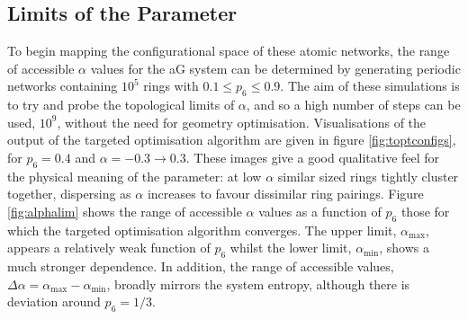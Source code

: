 \subsection{Limits of the \aw{} Parameter}

To begin mapping the configurational space of these atomic networks, the range of accessible $\alpha$ values for the aG system can be determined by generating periodic networks containing $10^5$ rings with $0.1\leq p_6 \leq 0.9$. 
The aim of these simulations is to try and probe the topological limits of $\alpha$, and so a high number of \mc{} steps can be used, $10^{9}$, without the need for geometry optimisation.
Visualisations of the output of the targeted optimisation algorithm are given in figure \ref{fig:toptconfigs}, for $p_6=0.4$ and $\alpha=-0.3\rightarrow 0.3$.
These images give a good qualitative feel for the physical meaning of the \aw{} parameter: at low $\alpha$ similar sized rings tightly cluster together, dispersing as $\alpha$ increases to favour dissimilar ring pairings.
Figure \ref{fig:alphalim} shows the range of accessible $\alpha$ values
as a function of $p_6$ \ie{} those for which the targeted optimisation algorithm converges.
The upper limit, $\alpha_{\mathrm{max}}$, appears a relatively weak function of $p_6$ whilst the lower limit, $\alpha_{\mathrm{min}}$, shows a much
stronger dependence.
In addition, the range of accessible values, $\Delta\alpha=\alpha_{\mathrm{max}}-\alpha_{\mathrm{min}}$, broadly mirrors the system entropy, although there is deviation around $p_6=1/3$.

